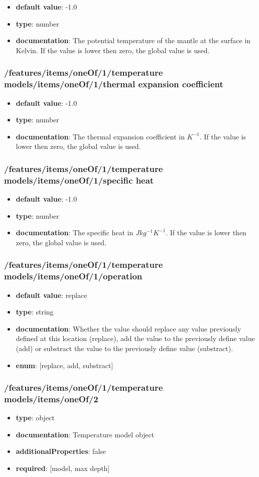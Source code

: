 \begin{itemize}\item {\bf default value}: -1.0
\item {\bf type}: number
\item {\bf documentation}: The potential temperature of the mantle at the surface in Kelvin. If the value is lower then zero, the global value is used.
\end{itemize}\subsubsection{/features/items/oneOf/1/temperature models/items/oneOf/1/thermal expansion coefficient}
\begin{itemize}\item {\bf default value}: -1.0
\item {\bf type}: number
\item {\bf documentation}: The thermal expansion coefficient in $K^{-1}$. If the value is lower then zero, the global value is used.
\end{itemize}\subsubsection{/features/items/oneOf/1/temperature models/items/oneOf/1/specific heat}
\begin{itemize}\item {\bf default value}: -1.0
\item {\bf type}: number
\item {\bf documentation}: The specific heat in $J kg^{-1} K^{-1}$. If the value is lower then zero, the global value is used.
\end{itemize}\subsubsection{/features/items/oneOf/1/temperature models/items/oneOf/1/operation}
\begin{itemize}\item {\bf default value}: replace
\item {\bf type}: string
\item {\bf documentation}: Whether the value should replace any value previously defined at this location (replace), add the value to the previously define value (add) or substract the value to the previously define value (substract).
\item {\bf enum}: [replace, add, substract]\end{itemize}\subsubsection{/features/items/oneOf/1/temperature models/items/oneOf/2}
\begin{itemize}\item {\bf type}: object
\item {\bf documentation}: Temperature model object
\item {\bf additionalProperties}: false
\item {\bf required}: [model, max depth]\end{itemize}
